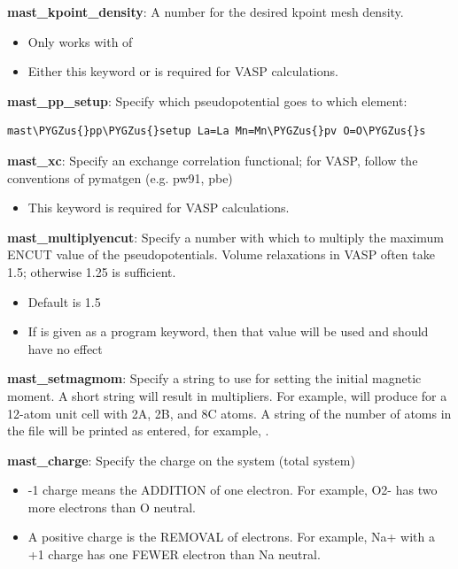 \documentclass[letterpaper,10pt,english]{sphinxmanual}
\def\PYGZus{\char`\_}
\begin{document}
\textbf{mast\_kpoint\_density}: A number for the desired kpoint mesh density.
\begin{itemize}
\item {} 
Only works with  of 

\item {} 
Either this keyword or  is required for VASP calculations.

\end{itemize}

\textbf{mast\_pp\_setup}: Specify which pseudopotential goes to which element:

\begin{Verbatim}[commandchars=\\\{\}]
mast\PYGZus{}pp\PYGZus{}setup La=La Mn=Mn\PYGZus{}pv O=O\PYGZus{}s
\end{Verbatim}

\textbf{mast\_xc}: Specify an exchange correlation functional; for VASP, follow the conventions of pymatgen (e.g. pw91, pbe)
\begin{itemize}
\item {} 
This keyword is required for VASP calculations.

\end{itemize}

\textbf{mast\_multiplyencut}: Specify a number with which to multiply the maximum ENCUT value of the pseudopotentials. Volume relaxations in VASP often take 1.5; otherwise 1.25 is sufficient.
\begin{itemize}
\item {} 
Default is 1.5

\item {} 
If  is given as a program keyword, then that value will be used and  should have no effect

\end{itemize}

\textbf{mast\_setmagmom}: Specify a string to use for setting the initial magnetic moment. A short string will result in multipliers. For example,  will produce  for a 12-atom unit cell with 2A, 2B, and 8C atoms. A string of the number of atoms in the  file will be printed as entered, for example, .

\textbf{mast\_charge}: Specify the charge on the system (total system)
\begin{itemize}
\item {} 
-1 charge means the ADDITION of one electron. For example, O2- has two more electrons than O neutral.

\item {} 
A positive charge is the REMOVAL of electrons. For example, Na+ with a +1 charge has one FEWER electron than Na neutral.

\end{itemize}
\end{document}
